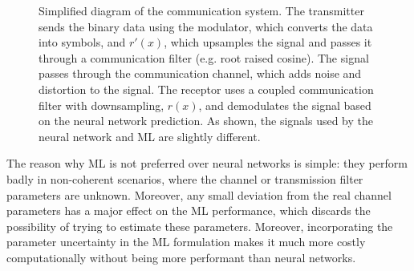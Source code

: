 \documentclass[conference]{IEEEtran}
\begin{document}
\begin{figure}
\caption{Simplified diagram of the communication system. The transmitter sends the binary data using the modulator, which converts the data into symbols, and $r'(x)$, which upsamples the signal and passes it through a communication filter (e.g. root raised cosine). The signal passes through the communication channel, which adds noise and distortion to the signal. The receptor uses a coupled communication filter with downsampling, $r(x)$, and demodulates the signal based on the neural network prediction. As shown, the signals used by the neural network and ML are slightly different.}
\label{fig:comm_system}
\end{figure}

The reason why ML is not preferred over neural networks is simple: they perform badly in non-coherent scenarios, where the channel or transmission filter parameters are unknown. Moreover, any small deviation from the real channel parameters has a major effect on the ML performance, which discards the possibility of trying to estimate these parameters. Moreover, incorporating the parameter uncertainty in the ML formulation makes it much more costly computationally without being more performant than neural networks.
\end{document}
